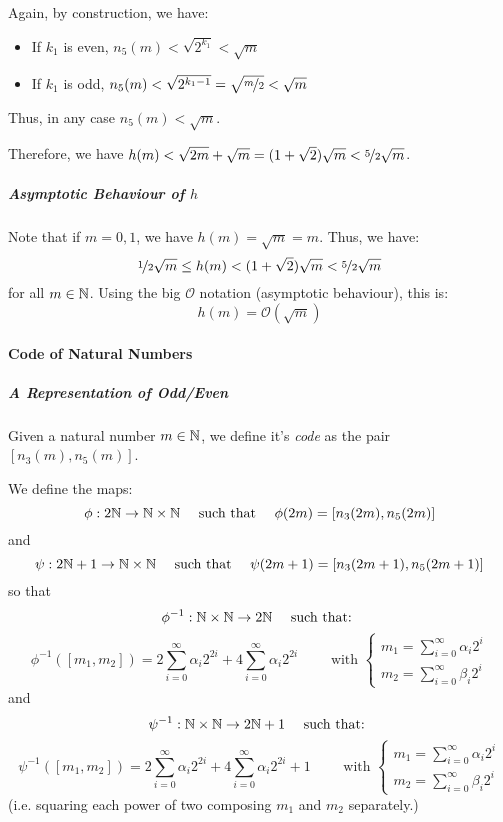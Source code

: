 Again, by construction, we have:
\begin{itemize}
	\item If $k_1$ is even, $n_5(m) < \sqrt{2^{k_1}} < \sqrt{m}$
	\item If $k_1$ is odd, $n_5(m) < \sqrt{2^{k_1-1}} = \sqrt{\nicefrac{m}{2}} < \sqrt{m}$
\end{itemize}
Thus, in any case $n_5(m) < \sqrt{m}$.

Therefore, we have $h(m) < \sqrt{2m} +  \sqrt{m} = (1+\sqrt{2}) \sqrt{m} < \nicefrac{5}{2}\sqrt{m}$.


\subparagraph{Asymptotic Behaviour of $h$}
Note that if $m=0,1$, we have $h(m) = \sqrt{m} = m$.
Thus, we have:
$$
\nicefrac{1}{2}\sqrt{m} \leq h(m) < (1+\sqrt{2}) \sqrt{m} < \nicefrac{5}{2}\sqrt{m}
$$
for all $m \in \mathbb{N}$.
Using the big $\mathcal{O}$ notation (asymptotic behaviour), this is:
$$
h(m) = \mathcal{O}(\sqrt{m})
$$


\paragraph{Code of Natural Numbers}
\subparagraph{A Representation of Odd/Even}
Given a natural number $m \in \mathbb{N}$, we define it's \textit{code} as the pair $\left[  n_3(m), n_5(m) \right]$.

We define the maps:
$$
\phi: 2\mathbb{N} \to \mathbb{N} \times \mathbb{N}
\quad \text{ such that } \quad 
\phi(2m) = \left[ n_3(2m), n_5(2m) \right]
$$
and
$$
\psi: 2\mathbb{N}+1 \to \mathbb{N} \times \mathbb{N}
\quad \text{ such that } \quad 
\psi(2m+1) = \left[ n_3(2m+1), n_5(2m+1) \right]
$$
so that 
$$\phi^{-1}: \mathbb{N} \times \mathbb{N} \to 2\mathbb{N} \quad \text{ such that: } $$
$$
\phi^{-1}(\left[ m_1, m_2 \right])
= 2\sum_{i=0}^{\infty} \alpha_i 2^{2i}
+ 4\sum_{i=0}^{\infty} \alpha_i 2^{2i}
\qquad \text{ with } \left\lbrace \begin{array}{c}
m_1 = \sum_{i=0}^{\infty} \alpha_i 2^i \\
m_2 = \sum_{i=0}^{\infty} \beta_i 2^i
\end{array} \right.
$$
and
$$\psi^{-1}: \mathbb{N} \times \mathbb{N} \to 2\mathbb{N}+1 \quad \text{ such that: } $$
$$
\psi^{-1}(\left[ m_1, m_2 \right])
= 2\sum_{i=0}^{\infty} \alpha_i 2^{2i} 
+ 4\sum_{i=0}^{\infty} \alpha_i 2^{2i}
+ 1
\qquad \text{ with } \left\lbrace \begin{array}{c}
	m_1 = \sum_{i=0}^{\infty} \alpha_i 2^i \\
	m_2 = \sum_{i=0}^{\infty} \beta_i 2^i
\end{array} \right.
$$
(i.e. squaring each power of two composing $m_1$ and $m_2$ separately.)

